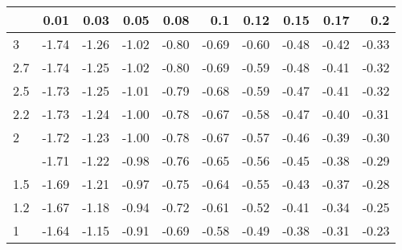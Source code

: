 
\begin{tabular}{lrrrrrrrrr}
\toprule
  & 0.01 & 0.03 & 0.05 & 0.08 & 0.1 & 0.12 & 0.15 & 0.17 & 0.2\\
\midrule
3 & -1.74 & -1.26 & -1.02 & -0.80 & -0.69 & -0.60 & -0.48 & -0.42 & -0.33\\
2.7 & -1.74 & -1.25 & -1.02 & -0.80 & -0.69 & -0.59 & -0.48 & -0.41 & -0.32\\
2.5 & -1.73 & -1.25 & -1.01 & -0.79 & -0.68 & -0.59 & -0.47 & -0.41 & -0.32\\
2.2 & -1.73 & -1.24 & -1.00 & -0.78 & -0.67 & -0.58 & -0.47 & -0.40 & -0.31\\
2 & -1.72 & -1.23 & -1.00 & -0.78 & -0.67 & -0.57 & -0.46 & -0.39 & -0.30\\
\addlinespace
1.7 & -1.71 & -1.22 & -0.98 & -0.76 & -0.65 & -0.56 & -0.45 & -0.38 & -0.29\\
1.5 & -1.69 & -1.21 & -0.97 & -0.75 & -0.64 & -0.55 & -0.43 & -0.37 & -0.28\\
1.2 & -1.67 & -1.18 & -0.94 & -0.72 & -0.61 & -0.52 & -0.41 & -0.34 & -0.25\\
1 & -1.64 & -1.15 & -0.91 & -0.69 & -0.58 & -0.49 & -0.38 & -0.31 & -0.23\\
\bottomrule
\end{tabular}
